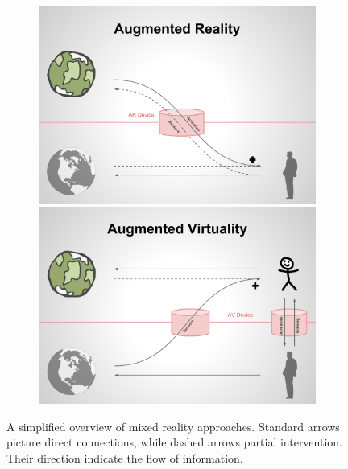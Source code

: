 \begin{figure}
\begin{subfigure}
\vspace*{0.3cm} %
\begin{minipage}[t]{0.49\textwidth}
\includegraphics[width=\linewidth]{schemas/augmentedreality}
\end{minipage}
\hspace{\fill}
\begin{minipage}[t]{0.49\textwidth}
\includegraphics[width=\linewidth]{schemas/augmentedvirtuality}
\end{minipage}
\end{subfigure}
\vspace*{-2mm}
\caption{A simplified overview of mixed reality approaches. Standard arrows picture direct connections, while dashed arrows partial intervention. Their direction indicate the flow of information.}
\label{fig:mixed_reality}
\end{figure}

